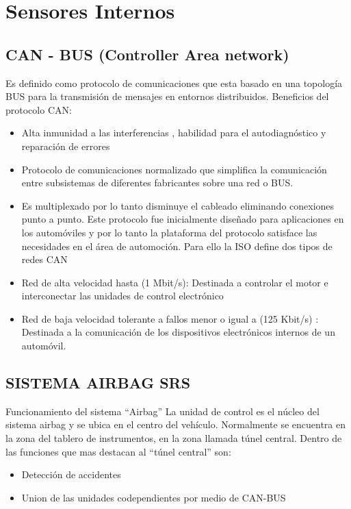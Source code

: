 \section{Sensores Internos}


\subsection{CAN - BUS (Controller Area network)}
Es definido como protocolo de comunicaciones  que esta basado en una topología BUS	 para la transmisión de mensajes en entornos distribuidos.
Beneficios del protocolo CAN:
\begin{itemize}


\item	Alta inmunidad a las interferencias , habilidad para el autodiagnóstico y reparación de errores 
\item	Protocolo de comunicaciones normalizado que  simplifica la comunicación entre subsistemas de diferentes fabricantes sobre una red o BUS.
\item	Es multiplexado por lo tanto disminuye el cableado eliminando conexiones punto a punto.
Este protocolo fue inicialmente diseñado para aplicaciones en los automóviles y por lo tanto la plataforma del protocolo satisface las necesidades en el área de automoción.
Para ello la ISO define dos tipos de redes CAN
\item	Red de alta velocidad hasta (1 Mbit/s): Destinada a controlar el motor e interconectar las unidades de control electrónico
\item	Red de baja velocidad tolerante a fallos menor o igual a (125 Kbit/s) : Destinada a la comunicación de los dispositivos electrónicos  internos de un automóvil.

\end{itemize}

\subsection{SISTEMA AIRBAG SRS}
Funcionamiento del sistema “Airbag”
La unidad de control es el núcleo del sistema airbag y se ubica en el centro del vehículo. Normalmente se encuentra en la zona del tablero de instrumentos, en la zona llamada túnel central.
Dentro de las funciones que mas destacan al “túnel central” son:
\begin{itemize}
\item	Detección de accidentes
\item	Union de las unidades codependientes por medio de CAN-BUS
\end{itemize}

